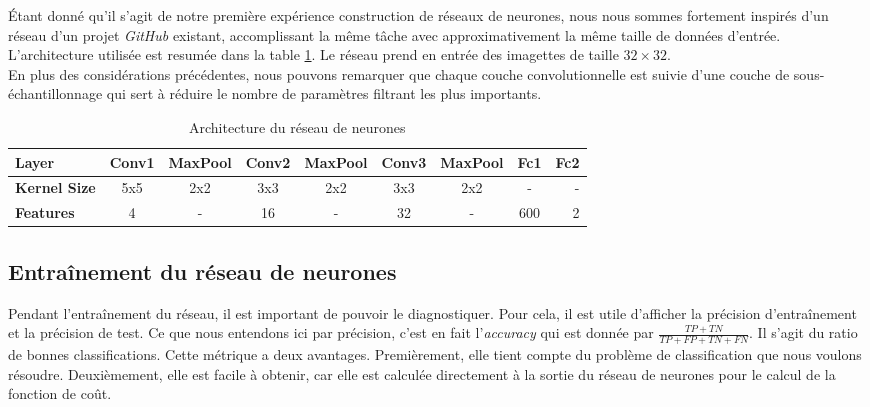 \documentclass[a4paper,11pt]{article}
\begin{document}
    Étant donné qu'il s'agit de notre première expérience construction de réseaux de neurones, nous nous sommes fortement inspirés d'un réseau d'un projet \textit{GitHub} \cite{face_detect} existant, accomplissant la même tâche avec approximativement la même taille de données d'entrée.
    \\
    L'architecture utilisée est resumée dans la table \ref{tab:network_architecture}. Le réseau prend en entrée des imagettes de taille $32\times32$.
    \\
    En plus des considérations précédentes, nous pouvons remarquer que chaque couche convolutionnelle est suivie d'une couche de sous-échantillonnage qui sert à réduire le nombre de paramètres filtrant les plus importants.
    \begin{table}
        \begin{tabular}{|l|c|c|c|c|c|c|c|r|}
            
            \hline
            \textbf{Layer} & Conv1 & MaxPool & Conv2 & MaxPool & Conv3 & MaxPool & Fc1 & Fc2 \\
            \hline
            \textbf{Kernel Size} & 5x5 & 2x2 & 3x3 & 2x2 & 3x3 & 2x2 & -  & - \\
            \textbf{Features} & 4 & - & 16 & - & 32 & - & 600  & 2 \\
            \hline
        \end{tabular}
        \caption{Architecture du réseau de neurones}
        \label{tab:network_architecture}
    \end{table}

\subsection{Entraînement du réseau de neurones}
    
    Pendant l'entraînement du réseau, il est important de pouvoir le diagnostiquer.
    Pour cela, il est utile d'afficher la précision d'entraînement et la précision de test.
    Ce que nous entendons ici par précision, c'est en fait l'\textit{accuracy} qui est donnée par $\frac{TP+TN}{TP+FP+TN+FN}$.
    Il s'agit du ratio de bonnes classifications.
    Cette métrique a deux avantages. 
    Premièrement, elle tient compte du problème de classification que nous voulons résoudre.
    Deuxièmement, elle est facile à obtenir, car elle est calculée directement à la sortie du réseau de neurones pour le calcul de la fonction de coût.
\end{document}
